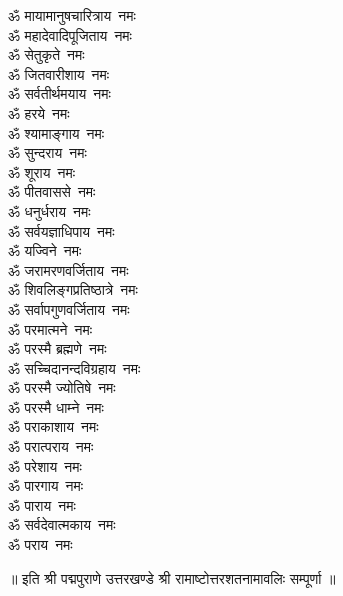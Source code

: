 \begin{multicols}{2}
\begin{flushleft}
ॐ मायामानुषचारित्राय~नमः\\
ॐ महादेवादिपूजिताय~नमः\\
ॐ सेतुकृते~नमः\\
ॐ जितवारीशाय~नमः\\
ॐ सर्वतीर्थमयाय~नमः\\
ॐ हरये~नमः\\
ॐ श्यामाङ्गाय~नमः\\
ॐ सुन्दराय~नमः\\
ॐ शूराय~नमः\\
ॐ पीतवाससे~नमः\hfill{}\\
ॐ धनुर्धराय~नमः\\
ॐ सर्वयज्ञाधिपाय~नमः\\
ॐ यज्विने~नमः\\
ॐ जरामरणवर्जिताय~नमः\\
ॐ शिवलिङ्गप्रतिष्ठात्रे~नमः\\
ॐ सर्वापगुणवर्जिताय~नमः\\
ॐ परमात्मने~नमः\\
ॐ परस्मै ब्रह्मणे~नमः\\
ॐ सच्चिदानन्दविग्रहाय~नमः\\
ॐ परस्मै ज्योतिषे~नमः\hfill{}\\
ॐ परस्मै धाम्ने~नमः\\
ॐ पराकाशाय~नमः\\
ॐ परात्पराय~नमः\\
ॐ परेशाय~नमः\\
ॐ पारगाय~नमः\\
ॐ पाराय~नमः\\
ॐ सर्वदेवात्मकाय~नमः\\
ॐ पराय~नमः\\
\end{flushleft}
\end{multicols}
\centerline{॥ इति श्री पद्मपुराणे उत्तरखण्डे श्री रामाष्टोत्तरशतनामावलिः सम्पूर्णा ॥}
